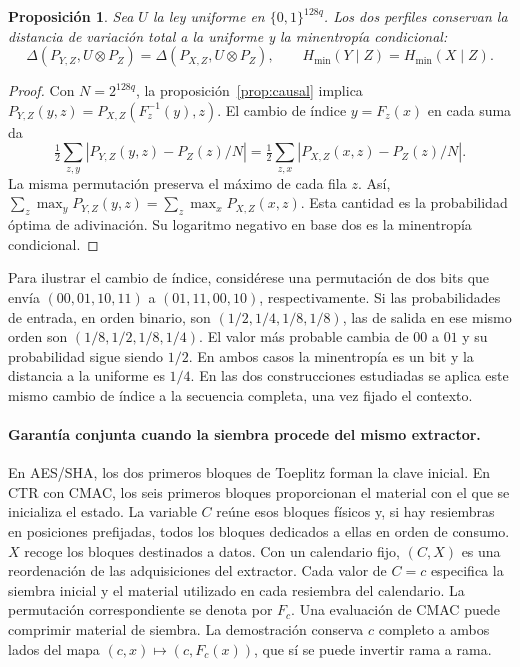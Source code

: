\documentclass[11pt,a4paper]{article}
\newtheorem{proposicion}{Proposición}
\newcommand{\bits}{\{0,1\}}
\begin{document}
\begin{proposicion}\label{prop:medidas}
Sea \(U\) la ley uniforme en \(\bits^{128q}\). Los dos perfiles conservan la distancia de variación total a la uniforme y la minentropía condicional:
\[
 \Delta(P_{Y,Z},U\otimes P_Z)=\Delta(P_{X,Z},U\otimes P_Z),
 \qquad H_{\min}(Y\mid Z)=H_{\min}(X\mid Z).
\]
\end{proposicion}
\begin{proof}
Con \(N=2^{128q}\), la proposición~\ref{prop:causal} implica
\(P_{Y,Z}(y,z)=P_{X,Z}(F_z^{-1}(y),z)\). El cambio de índice \(y=F_z(x)\) en cada suma da
\[
 \tfrac12\sum_{z,y}|P_{Y,Z}(y,z)-P_Z(z)/N|
 =\tfrac12\sum_{z,x}|P_{X,Z}(x,z)-P_Z(z)/N|.
\]
La misma permutación preserva el máximo de cada fila \(z\). Así,
\(\sum_z\max_y P_{Y,Z}(y,z)=\sum_z\max_x P_{X,Z}(x,z)\).
Esta cantidad es la probabilidad óptima de adivinación. Su logaritmo negativo en base dos es la minentropía condicional.
\end{proof}

Para ilustrar el cambio de índice, considérese una permutación de dos bits que envía \((00,01,10,11)\) a \((01,11,00,10)\), respectivamente. Si las probabilidades de entrada, en orden binario, son \((1/2,1/4,1/8,1/8)\), las de salida en ese mismo orden son \((1/8,1/2,1/8,1/4)\). El valor más probable cambia de \(00\) a \(01\) y su probabilidad sigue siendo \(1/2\). En ambos casos la minentropía es un bit y la distancia a la uniforme es \(1/4\). En las dos construcciones estudiadas se aplica este mismo cambio de índice a la secuencia completa, una vez fijado el contexto.

\paragraph{Garantía conjunta cuando la siembra procede del mismo extractor.}
En AES/SHA, los dos primeros bloques de Toeplitz forman la clave inicial. En CTR con CMAC, los seis primeros bloques proporcionan el material con el que se inicializa el estado. La variable \(C\) reúne esos bloques físicos y, si hay resiembras en posiciones prefijadas, todos los bloques dedicados a ellas en orden de consumo. \(X\) recoge los bloques destinados a datos. Con un calendario fijo, \((C,X)\) es una reordenación de las adquisiciones del extractor. Cada valor de \(C=c\) especifica la siembra inicial y el material utilizado en cada resiembra del calendario. La permutación correspondiente se denota por \(F_c\). Una evaluación de CMAC puede comprimir material de siembra. La demostración conserva \(c\) completo a ambos lados del mapa \((c,x)\mapsto(c,F_c(x))\), que sí se puede invertir rama a rama.
\end{document}
